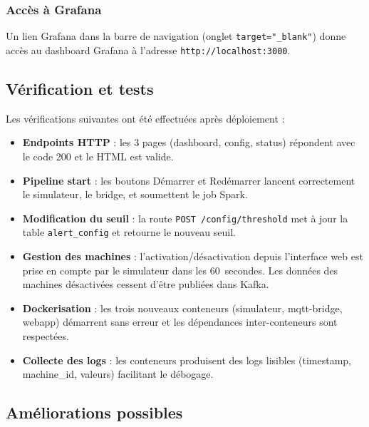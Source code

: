 \documentclass[12pt,a4paper]{article}
\begin{document}
\subsubsection{Accès à Grafana}

Un lien \og Grafana \fg{} dans la barre de navigation (onglet \texttt{target="\_blank"}) donne accès au dashboard Grafana à l'adresse \texttt{http://localhost:3000}.

\subsection{Vérification et tests}

Les vérifications suivantes ont été effectuées après déploiement :

\begin{itemize}
    \item \textbf{Endpoints HTTP} : les 3 pages (dashboard, config, status) répondent avec le code 200 et le HTML est valide.
    \item \textbf{Pipeline start} : les boutons Démarrer et Redémarrer lancent correctement le simulateur, le bridge, et soumettent le job Spark.
    \item \textbf{Modification du seuil} : la route \texttt{POST /config/threshold} met à jour la table \texttt{alert\_config} et retourne le nouveau seuil.
    \item \textbf{Gestion des machines} : l'activation/désactivation depuis l'interface web est prise en compte par le simulateur dans les 60~secondes. Les données des machines désactivées cessent d'être publiées dans Kafka.
    \item \textbf{Dockerisation} : les trois nouveaux conteneurs (simulateur, mqtt-bridge, webapp) démarrent sans erreur et les dépendances inter-conteneurs sont respectées.
    \item \textbf{Collecte des logs} : les conteneurs produisent des logs lisibles (timestamp, machine\_id, valeurs) facilitant le débogage.
\end{itemize}

\subsection{Améliorations possibles}
\end{document}
